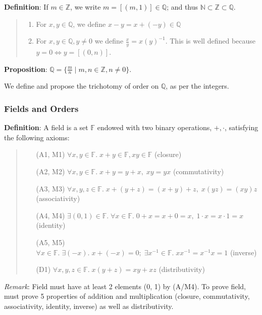 \documentclass[11pt]{article}
\begin{document}
\textbf{Definition}: If $m \in \mathbb{Z}$, we write $m = [(m,1)] \in \mathbb{Q}$; and thus $\mathbb{N} \subset \mathbb{Z} \subset \mathbb{Q}$.
\begin{quote}\vspace{-0.3cm}
	\begin{enumerate}
	\item For $x,y \in \mathbb{Q}$, we define $x-y = x+(-y) \in \mathbb{Q}$
	\item For $x,y \in \mathbb{Q}, y \neq 0$ we define $\frac{x}{y} = x(y)^{-1}$. This is well defined because $y=0 \iff y = [(0,n)]$.\end{enumerate}
\end{quote}
\textbf{Proposition}: $\mathbb{Q} = \{\frac{m}{n} \mid m,n \in \mathbb{Z}, n \neq 0\}$.

We define and propose the trichotomy of order on $\mathbb{Q}$, as per the integers.

\subsubsection{Fields and Orders}

\textbf{Definition}: A field is a set $\mathbb{F}$ endowed with two binary operations, $+, \cdot$, satisfying the following axioms:
\begin{quote}\vspace{-0.3cm}
	\begin{enumerate}
	\item[(A1, M1)] $\forall x,y \in \mathbb{F}.\; x+y \in \mathbb{F}, xy \in \mathbb{F}$ (closure)
	\item[(A2, M2)] $\forall x,y \in \mathbb{F}.\; x + y = y + x,\; xy = yx$ (commutativity)
	\item[(A3, M3)] $\forall x,y,z \in \mathbb{F}.\; x + (y+z) = (x+y) + z,\; x(yz) = (xy)z$ (associativity)
	\item[(A4, M4)] $\exists (0,1) \in \mathbb{F}.\; \forall x \in \mathbb{F}.\; 0 + x = x + 0 = x,\; 1 \cdot x = x \cdot 1 = x$ (identity)
	\item[(A5, M5)] $\forall x \in \mathbb{F}.\; \exists (-x).\; x + (-x) = 0;\; \exists x^{-1} \in \mathbb{F}.\; xx^{-1} = x^{-1}x = 1$ (inverse)
	\item[(D1)] $\forall x,y,z \in \mathbb{F}.\; x(y+z) = xy + xz$ (distributivity)
	\end{enumerate}
\end{quote}

\emph{Remark}: Field must have at least 2 elements (0, 1) by (A/M4). To prove field, must prove 5 properties of addition and multiplication (closure, commutativity, associativity, identity, inverse) as well as distributivity.
\end{document}
